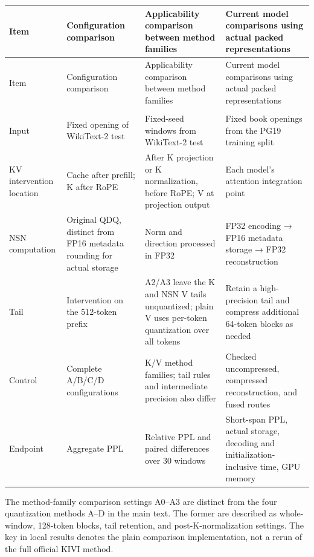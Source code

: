 \documentclass[10pt,a4paper]{article}
\newlength{\usable}
\begin{document}
\begingroup\fontsize{9.1}{12}\selectfont\setlength{\parskip}{1pt}
\setlength{\usable}{\dimexpr\linewidth-6\tabcolsep\relax}
\begin{longtable}{@{}>{\raggedright\arraybackslash}p{0.16\usable}>{\raggedright\arraybackslash}p{0.28\usable}>{\raggedright\arraybackslash}p{0.28\usable}>{\raggedright\arraybackslash}p{0.28\usable}@{}}
\toprule
Item & Configuration comparison & Applicability comparison between method families & Current model comparisons using actual packed representations \\
\midrule\endfirsthead
\toprule
Item & Configuration comparison & Applicability comparison between method families & Current model comparisons using actual packed representations \\
\midrule\endhead
\midrule
\multicolumn{4}{r}{\scriptsize Continued on the next page}\\\endfoot
\bottomrule\endlastfoot
Input & Fixed opening of WikiText-2 test & Fixed-seed windows from WikiText-2 test & Fixed book openings from the PG19 training split \\
KV intervention location & Cache after prefill; K after RoPE & After K projection or K normalization, before RoPE; V at projection output & Each model's attention integration point \\
NSN computation & Original QDQ, distinct from FP16 metadata rounding for actual storage & Norm and direction processed in FP32 & FP32 encoding → FP16 metadata storage → FP32 reconstruction \\
Tail & Intervention on the 512-token prefix & A2/A3 leave the K and NSN V tails unquantized; plain V uses per-token quantization over all tokens & Retain a high-precision tail and compress additional 64-token blocks as needed \\
Control & Complete A/B/C/D configurations & K/V method families; tail rules and intermediate precision also differ & Checked uncompressed, compressed reconstruction, and fused routes \\
Endpoint & Aggregate PPL & Relative PPL and paired differences over 30 windows & Short-span PPL, actual storage, decoding and initialization-inclusive time, GPU memory \\
\end{longtable}\endgroup

The method-family comparison settings A0--A3 are distinct from the four quantization methods A--D in the main text. The former are described as whole-window, 128-token blocks, tail retention, and post-K-normalization settings. The \texttt{} key in local results denotes the plain comparison implementation, not a rerun of the full official KIVI method.
\end{document}

